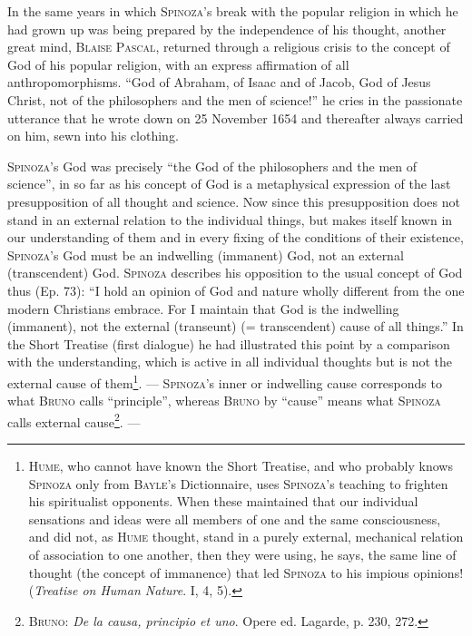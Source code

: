 \documentclass[12pt]{article}
\newcommand{\opage}[1]{\marginnote{\footnotesize\textit{[#1]}}}
\begin{document}
In the same years in which \textsc{Spinoza}'s break with the popular religion in
which he had grown up was being prepared by the independence of his thought,
another great \opage{7}mind, \textsc{Blaise Pascal}, returned through a religious
crisis to the concept of God of his popular religion, with an express affirmation
of all anthropomorphisms. ``God of Abraham, of Isaac and of Jacob, God of Jesus
Christ, not of the philosophers and the men of science!'' he cries in the
passionate utterance that he wrote down on 25 November 1654 and thereafter always
carried on him, sewn into his clothing.

\textsc{Spinoza}'s God was precisely ``the God of the philosophers and the men of
science'', in so far as his concept of God is a metaphysical expression of the
last presupposition of all thought and science. Now since this presupposition does
not stand in an external relation to the individual things, but makes itself known
in our understanding of them and in every fixing of the conditions of their
existence, \textsc{Spinoza}'s God must be an indwelling (immanent) God, not an
external (transcendent) God. \textsc{Spinoza} describes his opposition to the
usual concept of God thus (Ep. 73): ``I hold an opinion of God and nature wholly
different from the one modern Christians embrace. For I maintain that God is the
indwelling (immanent), not the external (transeunt) (= transcendent) cause of all
things.'' In the Short Treatise (first dialogue) he had illustrated this point by
a comparison with the understanding, which is active in all individual thoughts
but is not the external cause of them\footnote{\textsc{Hume}, who cannot have
known the Short Treatise, and who probably knows \textsc{Spinoza} only from
\textsc{Bayle}'s Dictionnaire, uses \textsc{Spinoza}'s teaching to frighten his
spiritualist opponents. When these maintained that our individual sensations and
ideas were all members of one and the same consciousness, and did not, as
\textsc{Hume} thought, stand in a purely external, mechanical relation of
association to one another, then they were using, he says, the same line of
thought (the concept of immanence) that led \textsc{Spinoza} to his impious
opinions! (\textit{Treatise on Human Nature}. I, 4, 5).}. --- \textsc{Spinoza}'s
inner or indwelling cause corresponds to what \textsc{Bruno} calls ``principle'',
whereas \textsc{Bruno} by ``cause'' means what \textsc{Spinoza} calls external
cause\footnote{\textsc{Bruno}: \textit{De la causa, principio et uno}. Opere ed.
Lagarde, p. 230, 272.}. ---
\end{document}
